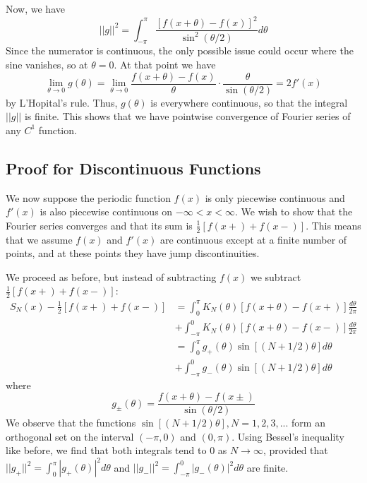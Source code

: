 Now, we have \begin{equation*}
    ||g||^2 = \int_{-\pi}^{\pi}\frac{[f(x+\theta)-f(x)]^2}{\sin^2(\theta/2)}d\theta
\end{equation*}
Since the numerator is continuous, the only possible issue could occur where the sine vanishes, so at $\theta = 0$. At that point we have \begin{equation*}
    \lim\limits_{\theta\rightarrow 0}g(\theta) = \lim\limits_{\theta\rightarrow 0}\frac{f(x+\theta)-f(x)}{\theta}\cdot\frac{\theta}{\sin(\theta/2)} = 2f'(x)
\end{equation*}
by L'Hopital's rule. Thus, $g(\theta)$ is everywhere continuous, so that the integral $||g||$ is finite. This shows that we have pointwise convergence of Fourier series of any $C^1$ function.

\subsection{Proof for Discontinuous Functions}

We now suppose the periodic function $f(x)$ is only piecewise continuous and $f'(x)$ is also piecewise continuous on $-\infty < x < \infty$. We wish to show that the Fourier series converges and that its sum is $\frac{1}{2}[f(x+)+f(x-)]$. This means that we assume $f(x)$ and $f'(x)$ are continuous except at a finite number of points, and at these points they have jump discontinuities. 

We proceed as before, but instead of subtracting $f(x)$ we subtract $\frac{1}{2}[f(x+)+f(x-)]$: \begin{align*}
    S_N(x) - \frac{1}{2}[f(x+)+f(x-)] &= \int_0^{\pi}K_N(\theta)[f(x+\theta)-f(x+)]\frac{d\theta}{2\pi} \\
    &+ \int_{-\pi}^0K_N(\theta)[f(x+\theta)-f(x-)]\frac{d\theta}{2\pi} \\
    &= \int_0^{\pi}g_+(\theta)\sin[(N+1/2)\theta]d\theta \\
    &+\int_{-\pi}^0g_-(\theta)\sin[(N+1/2)\theta]d\theta
\end{align*}
where \begin{equation*}
    g_{\pm}(\theta) = \frac{f(x+\theta)-f(x\pm)}{\sin(\theta/2)}
\end{equation*}
We observe that the functions $\sin[(N+1/2)\theta], N = 1,2,3,...$ form an orthogonal set on the interval $(-\pi,0)$ and $(0,\pi)$. Using Bessel's inequality like before, we find that both integrals tend to $0$ as $N\rightarrow \infty$, provided that $||g_+||^2 = \int_0^{\pi}|g_+(\theta)|^2d\theta$ and $||g_-||^2 = \int_{-\pi}^0|g_-(\theta)|^2d\theta$ are finite. 

